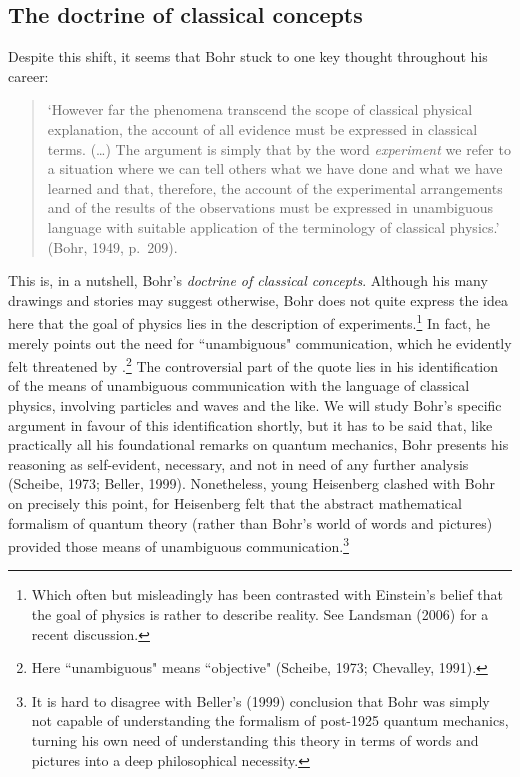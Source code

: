 \documentclass[12pt,titlepage]{article}
\begin{document}
\subsection{The doctrine of classical concepts}\label{Pcl}
Despite this shift, it seems that Bohr stuck to one key thought throughout his  career:
\begin{quote}
 `However far the phenomena transcend the scope of classical physical explanation, the account of all evidence must be expressed in classical terms. (\ldots) The argument is simply that by the word {\it experiment} we refer to a situation where we can tell others what we have done and what we have learned and that, therefore, the account of the experimental arrangements and of the results of the observations must be expressed in unambiguous language with suitable application of the terminology of classical physics.' (Bohr, 1949, p.\ 209).
\end{quote}

This is, in a nutshell, Bohr's {\it doctrine of classical concepts}. 
Although his many drawings and stories may suggest otherwise, Bohr does not quite express the idea here that the goal of physics lies in the description of experiments.\footnote{Which often but misleadingly has been contrasted with
Einstein's  belief that the  goal of physics is rather to describe reality.
See Landsman (2006) for a recent discussion. } In fact, he merely points out the need for ``unambiguous"  communication, which he evidently felt threatened by  \qm.\footnote{Here  ``unambiguous" means ``objective" (Scheibe, 1973; Chevalley, 1991).}
The controversial part of the quote lies in his identification of the means of unambiguous communication with the language of classical physics, involving particles and waves and the like. We will study Bohr's specific argument in favour of this identification shortly, but it has to be said that, like practically all his foundational remarks on quantum mechanics, Bohr presents his reasoning as self-evident, necessary, and not in need of any further analysis (Scheibe, 1973; Beller, 1999).  Nonetheless, young Heisenberg clashed with Bohr on precisely this point, for  Heisenberg felt that the abstract mathematical formalism of quantum theory (rather than Bohr's world of words and pictures) provided those means of unambiguous communication.\footnote{It is hard to disagree with Beller's (1999) conclusion that Bohr was simply not capable of understanding the formalism of post-1925 quantum mechanics, turning his own  need of understanding this theory in terms of words and pictures into a deep philosophical necessity.}
\end{document}
